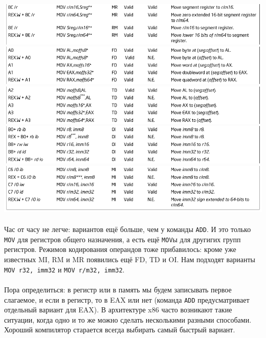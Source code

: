 \documentclass[11pt]{book}
\begin{document}
\\
\includegraphics[width=6.5in]{pic/mov_3.png}
\\
\includegraphics[width=6.5in]{pic/mov_4.png}
\\
\includegraphics[width=6.5in]{pic/mov_5.png}
\\
\includegraphics[width=6.5in]{pic/mov_6.png}
\\
\includegraphics[width=6.5in]{pic/mov_7.png}
\\ \\
Час от часу не легче: вариантов ещё больше, чем у команды \texttt{ADD}.
И это только \texttt{MOV} для регистров общего назначения, а есть ещё \texttt{MOV}ы для другигих групп регистров.
Режимов кодирования операндов тоже прибавилось: кроме уже известных MI, RM и MR появились ещё FD, TD и OI.
Нам подходят варианты \texttt{MOV r32, imm32} и \texttt{MOV r/m32, imm32}.
\\ \\
Пора определиться: в регистр или в память мы будем записывать первое слагаемое,
и если в регистр, то в EAX или нет (команда \texttt{ADD} предусматривает отдельный вариант для EAX).
В архитектуре x86 часто возникают такие ситуации, когда одно и то же можно сделать несколькими разными способами.
Хороший компилятор старается всегда выбирать самый быстрый вариант.
\end{document}
